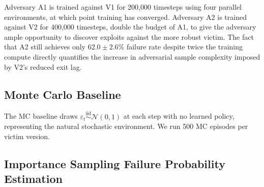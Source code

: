 \documentclass[conference]{IEEEtran}
\begin{document}
Adversary A1 is trained against V1 for 200{,}000 timesteps using four
parallel environments, at which point training has converged.
Adversary A2 is trained against V2 for 400{,}000 timesteps, double the
budget of A1, to give the adversary ample opportunity to discover exploits
against the more robust victim. The fact that A2 still achieves only $62.0 \pm
2.6\%$ failure rate despite twice the training compute directly quantifies
the increase in adversarial sample complexity imposed by V2's reduced exit lag.

\subsection{Monte Carlo Baseline}

The MC baseline draws $\varepsilon_t \stackrel{\mathrm{iid}}{\sim} \mathcal{N}(0,1)$
at each step with no learned policy, representing the natural stochastic
environment. We run 500 MC episodes per victim version.

\subsection{Importance Sampling Failure Probability Estimation}
\end{document}
